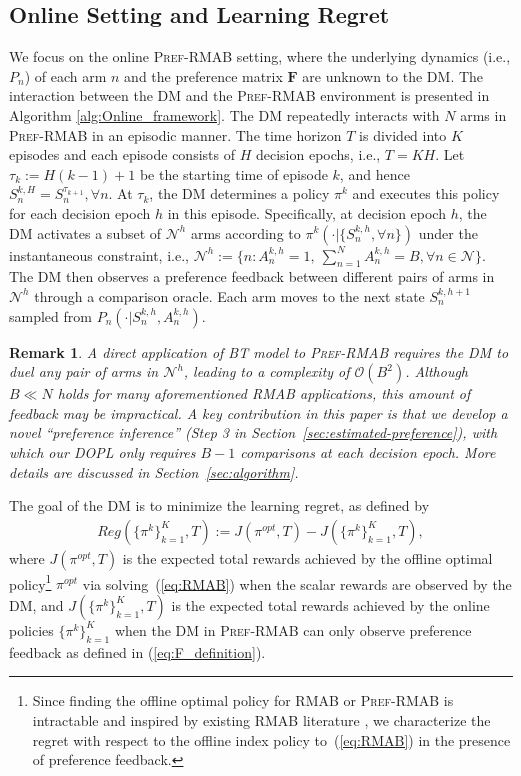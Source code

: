\documentclass{article} %
\def\eqref#1{equation~\ref{#1}}
\newcommand{\RMABPF}{\textsc{Pref-RMAB}\xspace}
\newcommand{\DOPL}{\textsc{DOPL}\xspace}
\newcommand{\bF}{\mathbf{F}}
\newcommand{\cN}{\mathcal{N}}
\newtheorem{remark}{Remark}
\renewcommand{\eqref}[1]{(\ref{#1})}
\begin{document}
\subsection{Online Setting and Learning Regret}\label{sec:onlinesetting}
We focus on the online \RMABPF setting, where the underlying dynamics (i.e., $P_n$) of each arm $n$ and the preference matrix $\bF$ are unknown to the DM.  The interaction between the DM and the \RMABPF environment is presented in Algorithm \ref{alg:Online_framework}. The DM repeatedly interacts with $N$ arms in \RMABPF in an episodic manner. The time horizon $T$ is divided into $K$ episodes and each episode consists of $H$ decision epochs, i.e., $T=KH$. Let $\tau_k:=H(k-1)+1$ be the starting time of episode $k$, and hence $S_n^{k,H}=S_n^{\tau_{k+1}}, \forall n$.  At $\tau_k$, the DM determines a policy $\pi^{k}$ and executes this policy for each decision epoch $h$ in this episode. Specifically, at decision epoch $h$, the DM activates a subset of $\cN^h$ arms according to $\pi^k(\cdot|\{S_n^{k,h}, \forall n\})$ under the instantaneous constraint, i.e., $\cN^h:=\{n: A_n^{k,h}=1,~\sum_{n=1}^N A_n^{k,h}=B, \forall n\in\cN\}$. The DM then observes a preference feedback between different pairs of arms in $\cN^h$ through a comparison oracle. Each arm moves to the next state $S_n^{k,h+1}$ sampled from $P_n(\cdot|S_n^{k,h}, A_n^{k,h})$. 
\begin{remark}\label{remark1}
A direct application of BT model to \RMABPF requires the DM to duel any pair of arms in $\cN^h$, leading to a complexity of $\mathcal{O}(B^2)$. Although $B\ll N$ holds for many aforementioned RMAB applications, this amount of feedback may be impractical. A key contribution in this paper is that we develop a novel ``preference inference'' (Step 3 in Section~\ref{sec:estimated-preference}), with which our \DOPL only requires $B-1$ comparisons at each decision epoch.  More details are discussed in Section~\ref{sec:algorithm}.
\end{remark}



The goal of the DM is to minimize the learning regret, as defined by 
\begin{align}\label{eq:regret}
    Reg(\{\pi^k\}_{k=1}^K, T):= J(\pi^{opt},T)-J(\{\pi^k\}_{k=1}^K, T),
\end{align}
where $J(\pi^{opt},T)$ is the expected total rewards achieved by the offline optimal policy\footnote{Since finding the offline optimal policy for RMAB or \RMABPF is intractable and inspired by existing RMAB literature \citep{wang2020restless,xiong2022Nips,wang2023optimistic}, we characterize the regret with respect to the offline index policy to~(\ref{eq:RMAB}) in the presence of preference feedback. %
} 
$\pi^{opt}$ via solving~(\ref{eq:RMAB}) when the scalar rewards are observed by the DM, and $J(\{\pi^k\}_{k=1}^K, T)$ is the expected total rewards achieved by the online policies $\{\pi^k\}_{k=1}^K$ when the DM in \RMABPF can only observe preference feedback as defined in \eqref{eq:F_definition}. 
\end{document}
